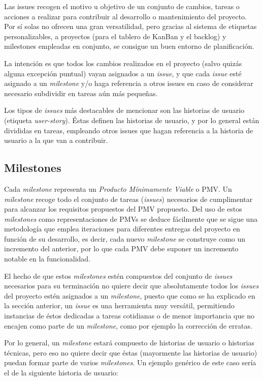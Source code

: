 Las issues recogen el motivo u objetivo de un conjunto de cambios, tareas o acciones a realizar para contribuir al desarrollo o mantenimiento del proyecto. Por sí solas no ofrecen una gran versatilidad, pero gracias al sistema de etiquetas personalizables, a proyectos (para el tablero de KanBan y el backlog) y milestones empleadas en conjunto, se consigue un buen entorno de planificación.

La intención es que todos los cambios realizados en el proyecto (salvo quizás alguna excepción puntual) vayan asignados a un \textit{issue}, y que cada \textit{issue} esté asignado a un \textit{milestone} y/o haga referencia a otros issues en caso de considerar necesario subdividir en tareas aún más pequeñas.

Los tipos de \textit{issues} más destacables de mencionar son las historias de usuario (etiqueta \textit{user-story}). Éstas definen las historias de usuario, y por lo general están divididas en tareas, empleando otros issues que hagan referencia a la historia de usuario a la que van a contribuir.

\subsection{Milestones}

Cada \textit{milestone} representa un \textit{Producto Mínimamente Viable} o PMV. Un \textit{milestone} recoge todo el conjunto de tareas (\textit{issues}) necesarios de cumplimentar para alcanzar los requisitos propuestos del PMV propuesto. Del uso de estos \textit{milestones} como representaciones de PMVs se deduce fácilmente que se sigue una metodología que emplea iteraciones para diferentes entregas del proyecto en función de su desarrollo, es decir, cada nuevo \textit{milestone} se construye como un incremento del anterior, por lo que cada PMV debe suponer un incremento notable en la funcionalidad.

El hecho de que estos \textit{milestones} estén compuestos del conjunto de \textit{issues} necesarios para su terminación no quiere decir que absolutamente todos los \textit{issues} del proyecto estén asignados a un \textit{milestone}, puesto que como se ha explicado en la sección anterior, un \textit{issue} es una herramienta muy versátil, permitiendo instancias de éstos dedicadas a tareas cotidianas o de menor importancia que no encajen como parte de un \textit{milestone}, como por ejemplo la corrección de erratas.

Por lo general, un \textit{milestone} estará compuesto de historias de usuario o historias técnicas, pero eso no quiere decir que éstas (mayormente las historias de usuario) puedan formar parte de varios \textit{milestones}. Un ejemplo genérico de este caso sería el de la siguiente historia de usuario:

